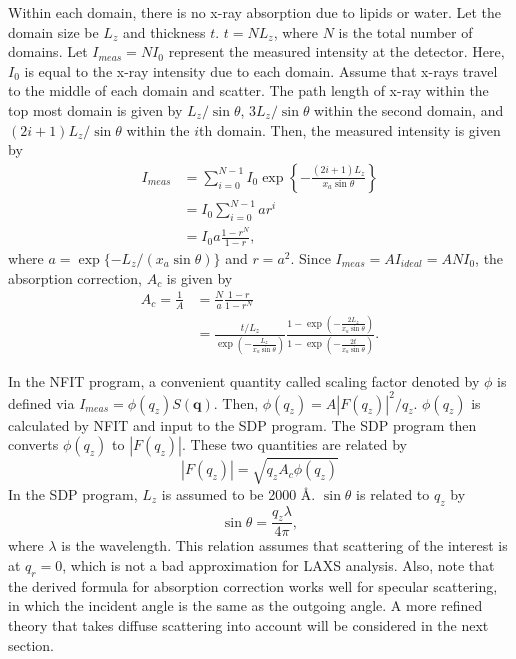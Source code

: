 \documentclass[letterpaper,12pt]{article}
\newcommand{\+}{^{\dagger}}%
\begin{document}
Within each domain, there is no x-ray
absorption due to lipids or water. Let the domain size be $L_z$ and thickness $t$.
$t=NL_z$, where $N$ is the total number of domains. Let $I_{meas}=NI_0$ represent
the measured intensity at the detector. Here, $I_0$ is equal to the x-ray intensity
due to each domain. Assume that x-rays travel to the middle of each domain and 
scatter. The path length of x-ray within the top most domain is given by 
$L_z/\sin\theta$, $3L_z/\sin\theta$ within the second domain, and 
$(2i+1)L_z/\sin\theta$ within the $i$th domain. Then, the measured intensity is
given by  
\begin{align}
  I_{meas} 
    &= \sum_{i=0}^{N-1} I_0 \exp
       \left\{-\frac{(2i+1)L_z}{x_a\sin\theta}\right\} \nonumber \\
    &= I_0 \sum_{i=0}^{N-1} ar^i \nonumber \\
    &= I_0 a \frac{1-r^N}{1-r},
\end{align}
where $a=\exp\{-L_z/(x_a\sin\theta)\}$ and $r=a^2$. 
Since $I_{meas}=AI_{ideal}=ANI_0$, the absorption correction, $A_c$ is given by
\begin{align}
  A_c = \frac{1}{A} &= \frac{N}{a} \frac{1-r}{1-r^N}\\
                    &= \frac{t/L_z}{\exp(-\frac{L_z}{x_a\sin\theta})} 
                       \frac{1-\exp(-\frac{2L_z}{x_a\sin\theta})} 
                            {1-\exp(-\frac{2t}{x_a\sin\theta})}.
\end{align}

In the NFIT program, a convenient quantity called scaling factor denoted by $\phi$ 
is defined via  $I_{meas}=\phi(q_z)S(\mathbf{q})$. Then, $\phi(q_z)=A|F(q_z)|^2/q_z$. 
$\phi(q_z)$ is calculated by NFIT and input to the SDP program. The SDP program then
converts $\phi(q_z)$ to $|F(q_z)|$. These two quantities are related by
\begin{equation}
  |F(q_z)|=\sqrt{q_zA_c\phi(q_z)}
\end{equation}
In the SDP program, $L_z$ is assumed to be 2000 \AA. $\sin\theta$ is related to $q_z$
by
\begin{equation}
  \sin\theta = \frac{q_z\lambda}{4\pi},
\end{equation}
where $\lambda$ is the wavelength. This relation assumes that scattering of the 
interest is at $q_r=0$, which is not a bad approximation for LAXS analysis. Also, note
that the derived formula for absorption correction works well for specular scattering,
in which the incident angle is the same as the outgoing angle. A more refined theory
that takes diffuse scattering into account will be considered in the next section. 
\end{document}
